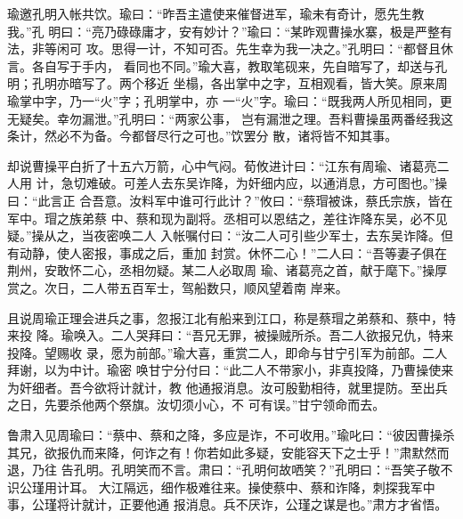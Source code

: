 瑜邀孔明入帐共饮。瑜曰：“昨吾主遣使来催督进军，瑜未有奇计，愿先生教我。”孔
明曰：“亮乃碌碌庸才，安有妙计？”瑜曰：“某昨观曹操水寨，极是严整有法，非等闲可
攻。思得一计，不知可否。先生幸为我一决之。”孔明曰：“都督且休言。各自写于手内，
看同也不同。”瑜大喜，教取笔砚来，先自暗写了，却送与孔明；孔明亦暗写了。两个移近
坐榻，各出掌中之字，互相观看，皆大笑。原来周瑜掌中字，乃一“火”字；孔明掌中，亦
一“火”字。瑜曰：“既我两人所见相同，更无疑矣。幸勿漏泄。”孔明曰：“两家公事，
岂有漏泄之理。吾料曹操虽两番经我这条计，然必不为备。今都督尽行之可也。”饮罢分
散，诸将皆不知其事。

却说曹操平白折了十五六万箭，心中气闷。荀攸进计曰：“江东有周瑜、诸葛亮二人用
计，急切难破。可差人去东吴诈降，为奸细内应，以通消息，方可图也。”操曰：“此言正
合吾意。汝料军中谁可行此计？”攸曰：“蔡瑁被诛，蔡氏宗族，皆在军中。瑁之族弟蔡
中、蔡和现为副将。丞相可以恩结之，差往诈降东吴，必不见疑。”操从之，当夜密唤二人
入帐嘱付曰：“汝二人可引些少军士，去东吴诈降。但有动静，使人密报，事成之后，重加
封赏。休怀二心！”二人曰：“吾等妻子俱在荆州，安敢怀二心，丞相勿疑。某二人必取周
瑜、诸葛亮之首，献于麾下。”操厚赏之。次日，二人带五百军士，驾船数只，顺风望着南
岸来。

且说周瑜正理会进兵之事，忽报江北有船来到江口，称是蔡瑁之弟蔡和、蔡中，特来投
降。瑜唤入。二人哭拜曰：“吾兄无罪，被操贼所杀。吾二人欲报兄仇，特来投降。望赐收
录，愿为前部。”瑜大喜，重赏二人，即命与甘宁引军为前部。二人拜谢，以为中计。瑜密
唤甘宁分付曰：“此二人不带家小，非真投降，乃曹操使来为奸细者。吾今欲将计就计，教
他通报消息。汝可殷勤相待，就里提防。至出兵之日，先要杀他两个祭旗。汝切须小心，不
可有误。”甘宁领命而去。

鲁肃入见周瑜曰：“蔡中、蔡和之降，多应是诈，不可收用。”瑜叱曰：“彼因曹操杀
其兄，欲报仇而来降，何诈之有！你若如此多疑，安能容天下之士乎！”肃默然而退，乃往
告孔明。孔明笑而不言。肃曰：“孔明何故哂笑？”孔明曰：“吾笑子敬不识公瑾用计耳。
大江隔远，细作极难往来。操使蔡中、蔡和诈降，刺探我军中事，公瑾将计就计，正要他通
报消息。兵不厌诈，公瑾之谋是也。”肃方才省悟。

